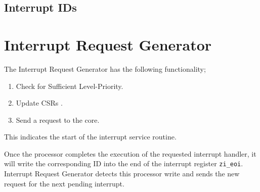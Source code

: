 \subsection{Interrupt IDs}

\section{Interrupt Request Generator}
\label{sec:interrupt-request-generate}
The Interrupt Request Generator has the following functionality;
\begin{enumerate}
    \item Check for Sufficient Level-Priority.
    \item Update CSRs .
    \item Send a request to the core.
\end{enumerate}

This indicates the start of the interrupt service routine.

Once the processor completes the execution of the requested interrupt handler, it will write the corresponding ID into the end of the interrupt register \texttt{zi\_eoi}. Interrupt Request Generator detects this processor write and sends the new request for the next pending interrupt.

